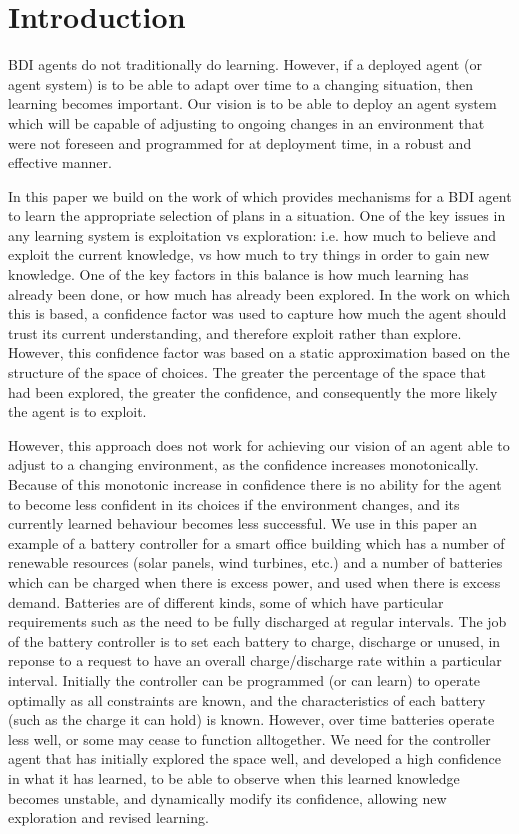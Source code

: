\section{Introduction}\label{sec:introduction}

BDI agents do not traditionally do learning. However, if a deployed agent
(or agent system) is to be able to adapt over time to a changing
situation, then learning becomes important. Our vision is to be able
to deploy an agent system which will be capable of adjusting to
ongoing changes in an environment that were not foreseen and
programmed for at deployment time, in a robust and effective manner.

In this paper we build on the work of \cite{} which provides
mechanisms for a BDI agent to learn the appropriate selection of plans
in a situation. One of the key issues in any learning system is
exploitation vs exploration: i.e. how much to believe and exploit the
current knowledge, vs how much to try things in order to gain new
knowledge. One of the key factors in this balance is how much learning
has already been done, or how much has already been explored. In the
work on which this is based, a confidence factor was used to capture
how much the agent should trust its current understanding, and
therefore exploit rather than explore. However, this confidence factor
was based on a static approximation based on the structure of the
space of choices. The greater the percentage of the space that had
been explored, the greater the confidence, and consequently the more
likely the agent is to exploit.  

However, this approach does not work for achieving our vision of an
agent able to adjust to a changing environment, as the confidence
increases monotonically. Because of this monotonic increase in
confidence there is no ability for the agent
to become less confident in its choices if the environment changes,
and its currently learned behaviour becomes less successful.
We use in this paper an example of a battery controller for a smart
office building which has a number of renewable resources (solar
panels, wind turbines, etc.) and a number of batteries which can be
charged when there is excess power, and used when there is excess
demand. Batteries are of different kinds, some of which have
particular requirements such as the need to be fully discharged at
regular intervals. The job of the battery controller is to set each
battery to charge, discharge or unused, in reponse to a request to
have an overall charge/discharge rate within a particular interval.
Initially the controller can be programmed (or can learn) to operate
optimally as all constraints are known, and the characteristics of
each battery (such as the charge it can hold) is known. However, over
time batteries operate less well, or some may cease to function
alltogether. We need for the controller agent that has initially
explored the space well, and developed a high confidence in what it
has learned, to be able to observe when this learned knowledge becomes
unstable, and dynamically modify its confidence, allowing new
exploration and revised learning.

